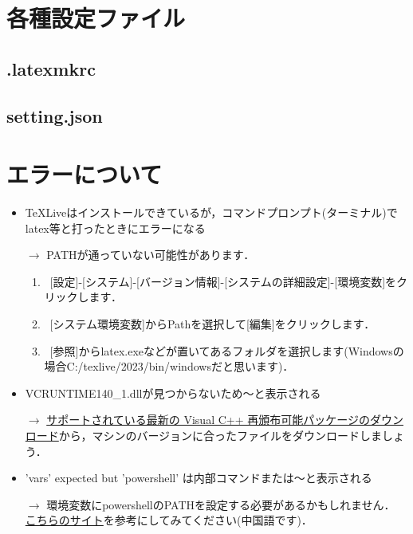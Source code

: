 \documentclass[a4paper,11pt]{ltjsreport}
\numberwithin{equation}{section}
\theoremstyle{definition}
\begin{document}
\section{各種設定ファイル}

\subsection{.latexmkrc}

\subsection{setting.json}


\section{エラーについて}

\begin{itemize}
    \item TeXLiveはインストールできているが，コマンドプロンプト(ターミナル)でlatex等と打ったときにエラーになる
    \item[$\rightarrow$] PATHが通っていない可能性があります．
          \begin{enumerate}
              \item\ [設定]-[システム]-[バージョン情報]-[システムの詳細設定]-[環境変数]をクリックします．
              \item\ [システム環境変数]からPathを選択して[編集]をクリックします．
              \item\ [参照]からlatex.exeなどが置いてあるフォルダを選択します(Windowsの場合C:/texlive/2023/bin/windowsだと思います)．
          \end{enumerate}
\end{itemize}

\begin{itemize}
    \item VCRUNTIME140\_1.dllが見つからないため〜と表示される
    \item[$\rightarrow$] \href{https://learn.microsoft.com/ja-JP/cpp/windows/latest-supported-vc-redist?view=msvc-170}{サポートされている最新の Visual C++ 再頒布可能パッケージのダウンロード}から，マシンのバージョンに合ったファイルをダウンロードしましょう．
\end{itemize}

\begin{itemize}
    \item 'vars' expected but 'powershell' は内部コマンドまたは〜と表示される
    \item[$\rightarrow$] 環境変数にpowershellのPATHを設定する必要があるかもしれません．
          \href{https://blog.csdn.net/weixin_45030118/article/details/130040386}{こちらのサイト}を参考にしてみてください(中国語です)．
\end{itemize}
\end{document}
